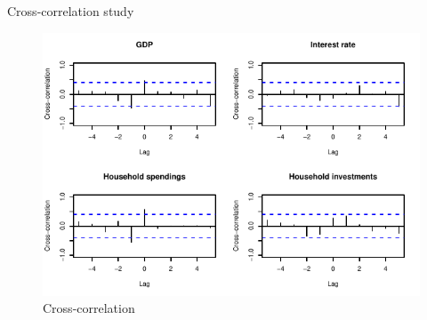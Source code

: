 \documentclass[11pt,ignorenonframetext,]{beamer}
\begin{document}
\begin{frame}{Cross-correlation study}
\protect\hypertarget{cross-correlation-study-1}{}

\FloatBarrier

\tiny

\begin{figure}[!htbp]

{\centering \includegraphics{presentation_files/figure-beamer/unnamed-chunk-24-1} 

}

\caption{Cross-correlation}\label{fig:unnamed-chunk-24}
\end{figure}

\normalsize

\FloatBarrier

\end{frame}
\end{document}
